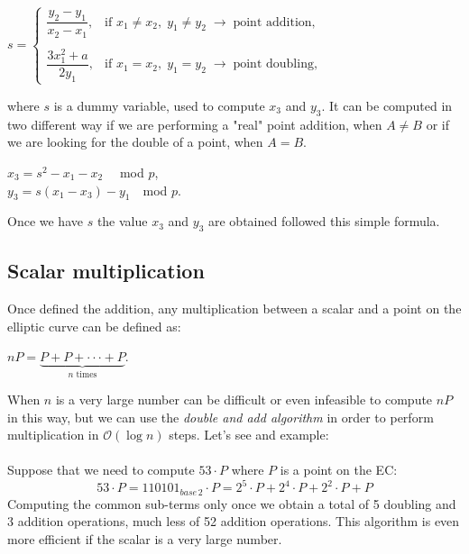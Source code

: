 \begin{center} 
	$s=\begin{cases} \dfrac{y_2-y_1}{x_2-x_1}, & \mbox{if } x_1\neq x_2, \; y_1\neq y_2 \;\rightarrow \; \text{point addition},\\ \\ \dfrac{3x_1^2+a}{2y_1}, & \mbox{if } x_1= x_2, \; y_1= y_2 \;\rightarrow \; \text{point doubling}, \end{cases}$
\end{center}
where $s$ is a dummy variable, used to compute $x_3$ and $y_3$. It can be computed in two different way if we are performing a "real" point addition, when $A\neq B$ or if we are looking for the double of a point, when $A= B$.
\begin{center} 
	$ x_3=s^2-x_1-x_2  \quad$ mod $p$,\\
	$y_3=s(x_1-x_3)-y_1  \quad$mod $p$.
\end{center}
Once we have $s$ the value $x_3$ and $y_3$ are obtained followed this simple formula.


\subsection{Scalar multiplication}
Once defined the addition, any multiplication between a scalar and a point on the elliptic curve can be defined as:
\begin{center} 
	$ nP=\underbrace{
		P+P+\cdot \cdot \cdot+P
	}_{n\text{ times}}$.
\end{center}
When $n$ is a very large number can be difficult or even infeasible to compute $nP$ in this way, but we can use the \textit{double and add algorithm} in order to perform multiplication in $\mathcal{O}(\log{}n)$ steps. Let's see and example:
\\ \\
Suppose that we need to compute $53 \cdot P$ where $P$ is a point on the EC:
\begin{equation*}
53 \cdot P = 110101_{base\, 2} \cdot P = 2^{5}\cdot P + 2^{4}\cdot P + 2^{2}\cdot P + P
\end{equation*}
Computing the common sub-terms only once we obtain a total of 5 doubling and 3 addition operations, much less of 52 addition operations. This algorithm is even more efficient if the scalar is a very large number.

